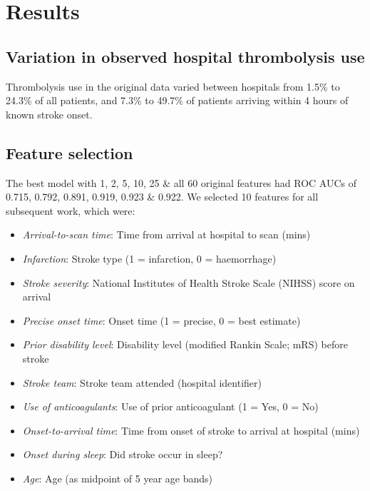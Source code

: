 \section{Results}

\subsection{Variation in observed hospital thrombolysis use}

Thrombolysis use in the original data varied between hospitals from 1.5\% to 24.3\% of all patients, and 7.3\% to 49.7\% of patients arriving within 4 hours of known stroke onset.


\subsection{Feature selection}

The best model with 1, 2, 5, 10, 25 \& all 60 original features had ROC AUCs of 0.715, 0.792, 0.891, 0.919, 0.923 \& 0.922. We selected 10 features for all subsequent work, which were:

\begin{itemize}
    \item \emph{Arrival-to-scan time}: Time from arrival at hospital to scan (mins)
    \item \emph{Infarction}: Stroke type (1 = infarction, 0 = haemorrhage)
    \item \emph{Stroke severity}: National Institutes of Health Stroke Scale (NIHSS) score on arrival
    \item \emph{Precise onset time}: Onset time (1 = precise, 0 = best estimate)
    \item \emph{Prior disability level}: Disability level (modified Rankin Scale; mRS) before stroke
    \item \emph{Stroke team}: Stroke team attended (hospital identifier)
    \item \emph{Use of anticoagulants}: Use of prior anticoagulant (1 = Yes, 0 = No)
    \item \emph{Onset-to-arrival time}: Time from onset of stroke to arrival at hospital (mins)
    \item \emph{Onset during sleep}: Did stroke occur in sleep?
    \item \emph{Age}: Age (as midpoint of 5 year age bands)
\end{itemize}

